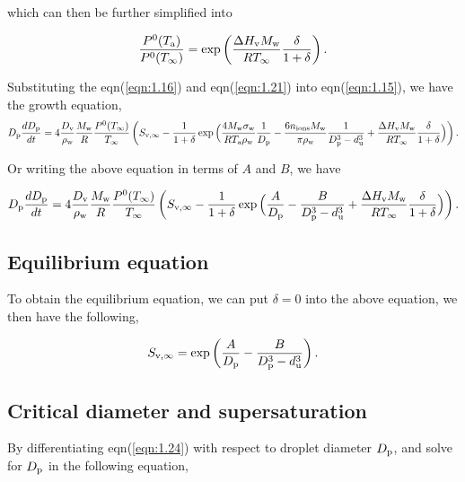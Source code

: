 \documentclass[12pt]{article}
\begin{document}
which can then be further simplified into 

\begin{equation}\label{eqn:1.21}
\frac{P^{\rm 0}(T_{\rm a})}{P^{\rm 0}(T_{\infty})}=\exp \left(\frac{\Delta H_{\rm v} M_{\rm w}}{R T_{\infty}} \frac{\delta}{1+\delta}\right).
\end{equation}

Substituting the eqn(\ref{eqn:1.16}) and eqn(\ref{eqn:1.21}) into eqn(\ref{eqn:1.15}), we have
the growth equation, 
\begin{equation}\label{eqn:1.22}
D_{\rm p}\frac{dD_{\rm p}}{dt}=4 \frac{D_{\rm v}} {\rho_{\rm w}} \frac{M_{\rm w}}{R} \frac{P^{\rm 0}(T_{\infty})} {T_{\infty}} \left(S_{\rm v, \infty} - \frac{1}{1+\delta} \exp \Big(\frac{4 M_{\rm w}\sigma_{\rm w}}{R T_{\rm a} \rho_{\rm w}}\frac{1}{D_{\rm p}}-\frac{6 n_{\rm ions} M_{\rm w}}{\pi \rho_{\rm w}} \frac{1}{D_{\rm p}^{3}-d_{\rm u}^{3}}+\frac{\Delta H_{\rm v} M_{\rm w}}{R T_{\infty}} \frac{\delta}{1+\delta}\Big)\right).
\end{equation}

Or writing the above equation in terms of  $A$ and $B$, we have

\begin{equation}\label{eqn:1.23}
D_{\rm p}\frac{dD_{\rm p}}{dt}=4 \frac{D_{\rm v}} {\rho_{\rm w}} \frac{M_{\rm w}}{R} \frac{P^{\rm 0}(T_{\infty})} {T_{\infty}} \left(S_{\rm v, \infty} - \frac{1}{1+\delta} \exp\Big(\frac{A}{D_{\rm p}}- \frac{B}{D_{\rm p}^{3}-d_{\rm u}^{3}}+\frac{\Delta H_{\rm v} M_{\rm w}}{R T_{\infty}} \frac{\delta}{1+\delta}\Big)\right).
\end{equation}
\subsection{Equilibrium equation}
To obtain the equilibrium equation, we can put $\delta=0$ into the above equation,  we then have the following,

\begin{equation}\label{eqn:1.24}
S_{\rm v, \infty} = \exp\left(\frac{A}{D_{\rm p}}- \frac{B}{D_{\rm p}^{3}-d_{\rm u}^{3}}\right).
\end{equation}


\subsection{Critical diameter and supersaturation} 

By differentiating eqn(\ref{eqn:1.24}) with respect to droplet diameter $D_{\rm p}$, and solve for $D_{\rm p}$ in the following equation,  
\end{document}
